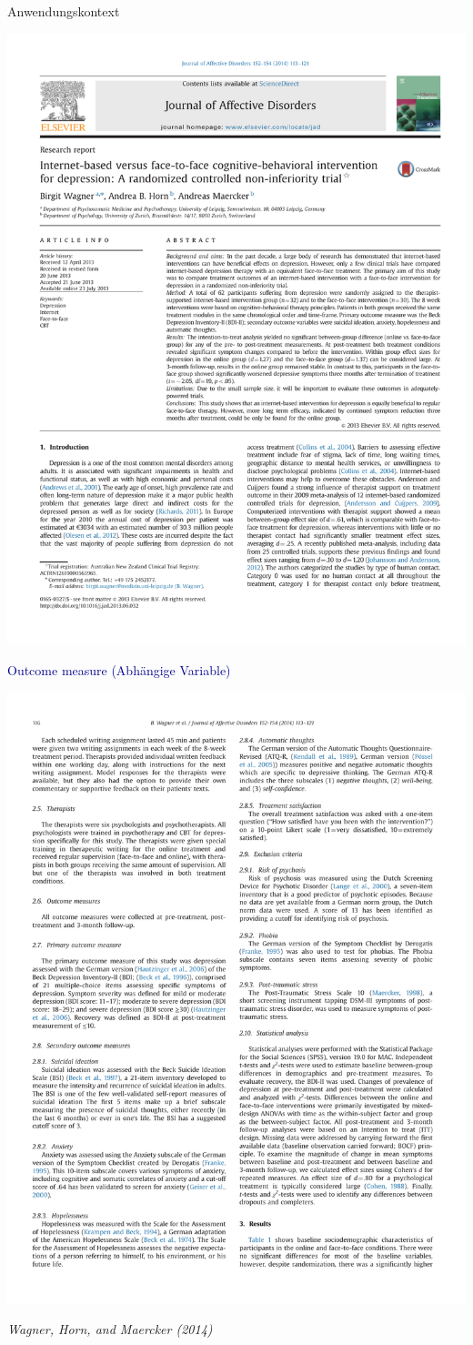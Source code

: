 \documentclass[
  8pt,
  ignorenonframetext,
]{beamer}
\begin{document}
\begin{frame}[t]{Anwendungskontext}
\protect\hypertarget{anwendungskontext-11}{}
\begin{center}\includegraphics[width=0.5\linewidth]{8_Abbildungen/alm_8_article_title} \end{center}
\center

\textcolor{darkblue}{Outcome measure (Abhängige Variable)}

\begin{center}\includegraphics[width=0.5\linewidth]{8_Abbildungen/alm_8_article_outcome_measures} \end{center}
\flushright
\footnotesize

\emph{Wagner, Horn, and Maercker (2014)}
\end{frame}
\end{document}

